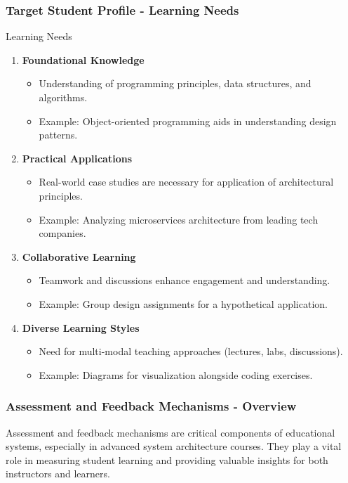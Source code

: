 \documentclass[aspectratio=169]{beamer}
\begin{document}
\begin{frame}[fragile]
    \frametitle{Target Student Profile - Learning Needs}
    \begin{block}{Learning Needs}
        \begin{enumerate}
            \item \textbf{Foundational Knowledge}
            \begin{itemize}
                \item Understanding of programming principles, data structures, and algorithms.
                \item Example: Object-oriented programming aids in understanding design patterns.
            \end{itemize}
            \item \textbf{Practical Applications}
            \begin{itemize}
                \item Real-world case studies are necessary for application of architectural principles.
                \item Example: Analyzing microservices architecture from leading tech companies.
            \end{itemize}
            \item \textbf{Collaborative Learning}
            \begin{itemize}
                \item Teamwork and discussions enhance engagement and understanding.
                \item Example: Group design assignments for a hypothetical application.
            \end{itemize}
            \item \textbf{Diverse Learning Styles}
            \begin{itemize}
                \item Need for multi-modal teaching approaches (lectures, labs, discussions).
                \item Example: Diagrams for visualization alongside coding exercises.
            \end{itemize}
        \end{enumerate}
    \end{block}
\end{frame}

\begin{frame}[fragile]
    \frametitle{Assessment and Feedback Mechanisms - Overview}
    Assessment and feedback mechanisms are critical components of educational systems, especially in advanced system architecture courses. They play a vital role in measuring student learning and providing valuable insights for both instructors and learners.
\end{frame}
\end{document}
